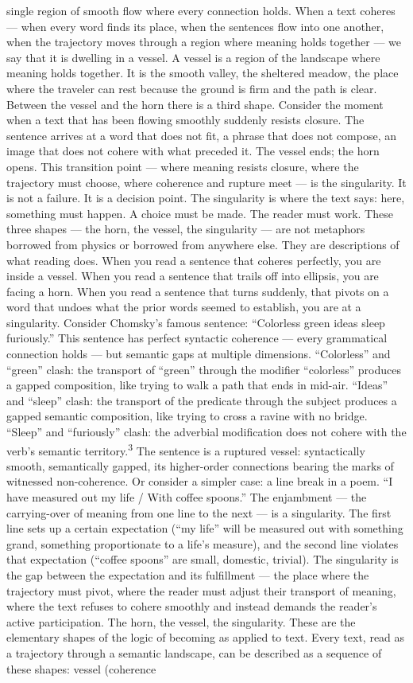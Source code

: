 single region of smooth flow where every connection holds. When a text coheres — when every word finds its place, when the sentences flow into one another, when the trajectory moves through a region where meaning holds together — we say that it is dwelling in a vessel. A vessel is a region of the landscape where meaning holds together. It is the smooth valley, the sheltered meadow, the place where the traveler can rest because the ground is firm and the path is clear. Between the vessel and the horn there is a third shape. Consider the moment when a text that has been flowing smoothly suddenly resists closure. The sentence arrives at a word that does not fit, a phrase that does not compose, an image that does not cohere with what preceded it. The vessel ends; the horn opens. This transition point — where meaning resists closure, where the trajectory must choose, where coherence and rupture meet — is the singularity. It is not a failure. It is a decision point. The singularity is where the text says: here, something must happen. A choice must be made. The reader must work. These three shapes — the horn, the vessel, the singularity — are not metaphors borrowed from physics or borrowed from anywhere else. They are descriptions of what reading does. When you read a sentence that coheres perfectly, you are inside a vessel. When you read a sentence that trails off into ellipsis, you are facing a horn. When you read a sentence that turns suddenly, that pivots on a word that undoes what the prior words seemed to establish, you are at a singularity. Consider Chomsky’s famous sentence: “Colorless green ideas sleep furiously.” This sentence has perfect syntactic coherence — every grammatical connection holds — but semantic gaps at multiple dimensions. “Colorless” and “green” clash: the transport of “green” through the modifier “colorless” produces a gapped composition, like trying to walk a path that ends in mid-air. “Ideas” and “sleep” clash: the transport of the predicate through the subject produces a gapped semantic composition, like trying to cross a ravine with no bridge. “Sleep” and “furiously” clash: the adverbial modification does not cohere with the verb’s semantic territory.\textsuperscript{3} The sentence is a ruptured vessel: syntactically smooth, semantically gapped, its higher-order connections bearing the marks of witnessed non-coherence. Or consider a simpler case: a line break in a poem. “I have measured out my life / With coffee spoons.” The enjambment — the carrying-over of meaning from one line to the next — is a singularity. The first line sets up a certain expectation (“my life” will be measured out with something grand, something proportionate to a life’s measure), and the second line violates that expectation (“coffee spoons” are small, domestic, trivial). The singularity is the gap between the expectation and its fulfillment — the place where the trajectory must pivot, where the reader must adjust their transport of meaning, where the text refuses to cohere smoothly and instead demands the reader’s active participation. The horn, the vessel, the singularity. These are the elementary shapes of the logic of becoming as applied to text. Every text, read as a trajectory through a semantic landscape, can be described as a sequence of these shapes: vessel (coherence 